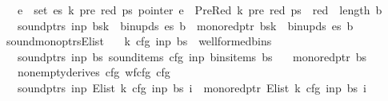 \begin{isabellebody}
\ \ \ {\isachardoublequoteopen}{\isasymforall}e\ {\isasymin}\ set\ es{\isachardot}{\kern0pt}\ {\isasymforall}k{\isacharprime}{\kern0pt}\ pre\ red\ ps{\isachardot}{\kern0pt}\ pointer\ e\ {\isacharequal}{\kern0pt}\ PreRed\ {\isacharparenleft}{\kern0pt}k{\isacharprime}{\kern0pt}{\isacharcomma}{\kern0pt}\ pre{\isacharcomma}{\kern0pt}\ red{\isacharparenright}{\kern0pt}\ ps\ {\isasymlongrightarrow}\ red\ {\isacharless}{\kern0pt}\ length\ b{\isachardoublequoteclose}\isanewline
\ \ \ {\isachardoublequoteopen}sound{\isacharunderscore}{\kern0pt}ptrs\ inp\ {\isacharparenleft}{\kern0pt}bs{\isacharbrackleft}{\kern0pt}k\ {\isacharcolon}{\kern0pt}{\isacharequal}{\kern0pt}\ bin{\isacharunderscore}{\kern0pt}upds\ es\ b{\isacharbrackright}{\kern0pt}{\isacharparenright}{\kern0pt}\ {\isasymand}\ mono{\isacharunderscore}{\kern0pt}red{\isacharunderscore}{\kern0pt}ptr\ {\isacharparenleft}{\kern0pt}bs{\isacharbrackleft}{\kern0pt}k\ {\isacharcolon}{\kern0pt}{\isacharequal}{\kern0pt}\ bin{\isacharunderscore}{\kern0pt}upds\ es\ b{\isacharbrackright}{\kern0pt}{\isacharparenright}{\kern0pt}{\isachardoublequoteclose}%
\isadelimproof
%
\endisadelimproof
%
\isatagproof
%
\endisatagproof
{\isafoldproof}%
%
\isadelimproof
\isanewline
%
\endisadelimproof
{}\isamarkupfalse%
\ sound{\isacharunderscore}{\kern0pt}mono{\isacharunderscore}{\kern0pt}ptrs{\isacharunderscore}{\kern0pt}E{\isacharunderscore}{\kern0pt}list{\isacharprime}{\kern0pt}{\isacharcolon}{\kern0pt}\isanewline
\ \ \ {\isachardoublequoteopen}{\isacharparenleft}{\kern0pt}k{\isacharcomma}{\kern0pt}\ cfg{\isacharcomma}{\kern0pt}\ inp{\isacharcomma}{\kern0pt}\ bs{\isacharparenright}{\kern0pt}\ {\isasymin}\ wellformed{\isacharunderscore}{\kern0pt}bins{\isachardoublequoteclose}\isanewline
\ \ \ {\isachardoublequoteopen}sound{\isacharunderscore}{\kern0pt}ptrs\ inp\ bs{\isachardoublequoteclose}\ {\isachardoublequoteopen}sound{\isacharunderscore}{\kern0pt}items\ cfg\ inp\ {\isacharparenleft}{\kern0pt}bins{\isacharunderscore}{\kern0pt}items\ bs{\isacharparenright}{\kern0pt}{\isachardoublequoteclose}\isanewline
\ \ \ {\isachardoublequoteopen}mono{\isacharunderscore}{\kern0pt}red{\isacharunderscore}{\kern0pt}ptr\ bs{\isachardoublequoteclose}\isanewline
\ \ \ {\isachardoublequoteopen}nonempty{\isacharunderscore}{\kern0pt}derives\ cfg{\isachardoublequoteclose}\ {\isachardoublequoteopen}wf{\isacharunderscore}{\kern0pt}cfg\ cfg{\isachardoublequoteclose}\isanewline
\ \ \ {\isachardoublequoteopen}sound{\isacharunderscore}{\kern0pt}ptrs\ inp\ {\isacharparenleft}{\kern0pt}E{\isacharunderscore}{\kern0pt}list{\isacharprime}{\kern0pt}\ k\ cfg\ inp\ bs\ i{\isacharparenright}{\kern0pt}\ {\isasymand}\ mono{\isacharunderscore}{\kern0pt}red{\isacharunderscore}{\kern0pt}ptr\ {\isacharparenleft}{\kern0pt}E{\isacharunderscore}{\kern0pt}list{\isacharprime}{\kern0pt}\ k\ cfg\ inp\ bs\ i{\isacharparenright}{\kern0pt}{\isachardoublequoteclose}%

\end{isabellebody}
